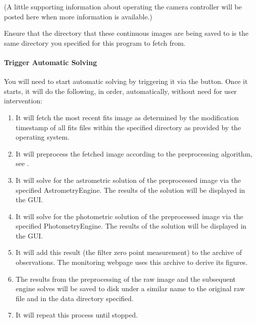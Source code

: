 \documentclass[letterpaper,11pt,english]{sphinxmanual}
\begin{document}
\sphinxAtStartPar
(A little supporting information about operating the camera controller will
be posted here when more information is available.)

\sphinxAtStartPar
Ensure that the directory that these continuous images are being saved to is
the same directory you specified for this program to fetch from.


\paragraph{Trigger Automatic Solving}
\label{\detokenize{user/automatic_mode:trigger-automatic-solving}}
\sphinxAtStartPar
You will need to start automatic solving by triggering it via the 
button. Once it starts, it will do the following, in order, automatically,
without need for user intervention:
\begin{enumerate}
%
\item {} 
\sphinxAtStartPar
It will fetch the most recent fits image as determined by the modification timestamp of all fits files within the specified directory as provided by the operating system.

\item {} 
\sphinxAtStartPar
It will pre\sphinxhyphen{}process the fetched image according to the preprocessing algorithm, see {\hyperref[\detokenize{technical/algorithms/preprocessing:technical-algorithms-preprocessing}]{}}.

\item {} 
\sphinxAtStartPar
It will solve for the astrometric solution of the pre\sphinxhyphen{}processed image via the specified AstrometryEngine. The results of the solution will be displayed in the GUI.

\item {} 
\sphinxAtStartPar
It will solve for the photometric solution of the pre\sphinxhyphen{}processed image via the specified PhotometryEngine. The results of the solution will be displayed in the GUI.

\item {} 
\sphinxAtStartPar
It will add this result (the filter zero point measurement) to the archive of observations. The monitoring webpage uses this archive to derive its figures.

\item {} 
\sphinxAtStartPar
The results from the pre\sphinxhyphen{}processing of the raw image and the subsequent engine solves will be saved to disk under a similar name to the original raw file and in the data directory specified.

\item {} 
\sphinxAtStartPar
It will repeat this process until stopped.

\end{enumerate}
\end{document}
